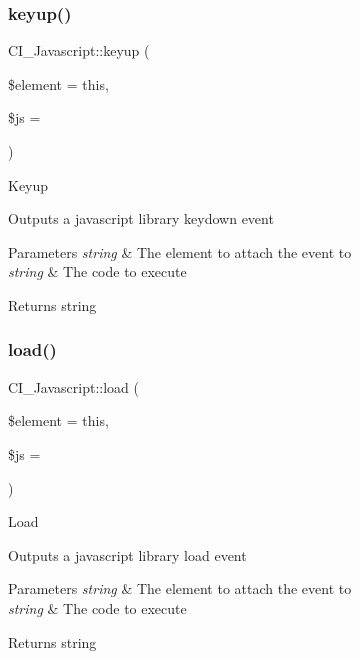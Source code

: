 \subsubsection{\texorpdfstring{keyup()}{keyup()}}
{\footnotesize\ttfamily C\+I\+\_\+\+Javascript\+::keyup (\begin{DoxyParamCaption}\item[{}]{\$element = {\ttfamily \textquotesingle{}this\textquotesingle{}},  }\item[{}]{\$js = {\ttfamily \textquotesingle{}\textquotesingle{}} }\end{DoxyParamCaption})}

Keyup

Outputs a javascript library keydown event


\begin{DoxyParams}{Parameters}
{\em string} & The element to attach the event to \\
\hline
{\em string} & The code to execute \\
\hline
\end{DoxyParams}
\begin{DoxyReturn}{Returns}
string 
\end{DoxyReturn}
\mbox{\label{class_c_i___javascript_ac4ae2cbab904d31d29d95e002c2999e2}} 
\subsubsection{\texorpdfstring{load()}{load()}}
{\footnotesize\ttfamily C\+I\+\_\+\+Javascript\+::load (\begin{DoxyParamCaption}\item[{}]{\$element = {\ttfamily \textquotesingle{}this\textquotesingle{}},  }\item[{}]{\$js = {\ttfamily \textquotesingle{}\textquotesingle{}} }\end{DoxyParamCaption})}

Load

Outputs a javascript library load event


\begin{DoxyParams}{Parameters}
{\em string} & The element to attach the event to \\
\hline
{\em string} & The code to execute \\
\hline
\end{DoxyParams}
\begin{DoxyReturn}{Returns}
string 
\end{DoxyReturn}
\mbox{\label{class_c_i___javascript_aed25f3d7f9415ba41edd4547d8e0c040}} 
